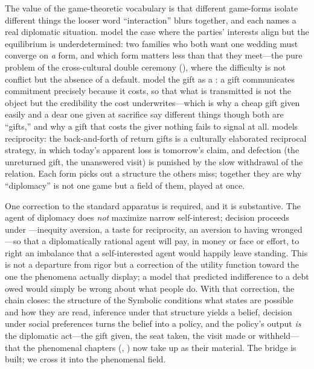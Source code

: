 The value of the game-theoretic vocabulary is that different game-forms isolate different things the looser word ``interaction'' blurs together, and each names a real diplomatic situation.  model the case where the parties' interests align but the equilibrium is underdetermined: two families who both want one wedding must converge on \emph{a} form, and which form matters less than that they meet---the pure problem of the cross-cultural double ceremony (), where the difficulty is not conflict but the absence of a default.  model the gift as a : a gift communicates commitment precisely because it costs, so that what is transmitted is not the object but the credibility the cost underwrites---which is why a cheap gift given easily and a dear one given at sacrifice say different things though both are ``gifts,'' and why a gift that costs the giver nothing fails to signal at all.  models reciprocity: the back-and-forth of return gifts is a culturally elaborated reciprocal strategy, in which today's apparent loss is tomorrow's claim, and defection (the unreturned gift, the unanswered visit) is punished by the slow withdrawal of the relation. Each form picks out a structure the others miss; together they are why ``diplomacy'' is not one game but a field of them, played at once.

One correction to the standard apparatus is required, and it is substantive. The agent of diplomacy does \emph{not} maximize narrow self-interest; decision proceeds under ---inequity aversion, a taste for reciprocity, an aversion to having wronged---so that a diplomatically rational agent will pay, in money or face or effort, to right an imbalance that a self-interested agent would happily leave standing. This is not a departure from rigor but a correction of the utility function toward the one the phenomena actually display; a model that predicted indifference to a debt owed would simply be wrong about what people do. With that correction, the chain closes: the structure of the Symbolic conditions what states are possible and how they are read, inference under that structure yields a belief, decision under social preferences turns the belief into a policy, and the policy's output \emph{is} the diplomatic act---the gift given, the seat taken, the visit made or withheld---that the phenomenal chapters (, ) now take up as their material. The bridge is built; we cross it into the phenomenal field.

